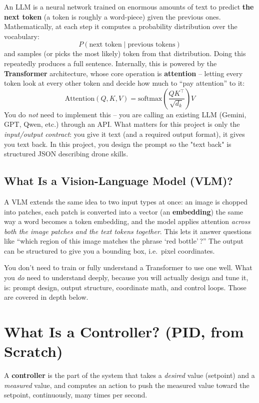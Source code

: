 \documentclass[11pt,a4paper]{article}
\begin{document}
An LLM is a neural network trained on enormous amounts of text to predict \textbf{the next
token} (a token is roughly a word-piece) given the previous ones. Mathematically, at each step
it computes a probability distribution over the vocabulary:
\[
P(\text{next token} \mid \text{previous tokens})
\]
and samples (or picks the most likely) token from that distribution. Doing this repeatedly
produces a full sentence. Internally, this is powered by the \textbf{Transformer} architecture,
whose core operation is \textbf{attention} -- letting every token look at every other token and
decide how much to ``pay attention'' to it:
\[
\text{Attention}(Q,K,V) = \text{softmax}\!\left(\frac{QK^{\top}}{\sqrt{d_k}}\right)V
\]
You do \emph{not} need to implement this -- you are calling an existing LLM (Gemini, GPT, Qwen,
etc.) through an API. What matters for this project is only the \emph{input/output contract}:
you give it text (and a required output format), it gives you text back. In this project, you
design the prompt so the "text back" is structured JSON describing drone skills.

\subsection{What Is a Vision-Language Model (VLM)?}

A VLM extends the same idea to two input types at once: an image is chopped into patches,
each patch is converted into a vector (an \textbf{embedding}) the same way a word becomes a
token embedding, and the model applies attention \emph{across both the image patches and the
text tokens together}. This lets it answer questions like ``which region of this image matches
the phrase `red bottle'\,?'' The output can be structured to give you a bounding box, i.e.\ pixel
coordinates.

\begin{quotebox}
You don't need to train or fully understand a Transformer to use one well. What you \emph{do}
need to understand deeply, because you will actually design and tune it, is: prompt design,
output structure, coordinate math, and control loops. Those are covered in depth below.
\end{quotebox}

\section{What Is a Controller? (PID, from Scratch)}
\label{sec:pid}

A \textbf{controller} is the part of the system that takes a \emph{desired} value (setpoint) and
a \emph{measured} value, and computes an action to push the measured value toward the setpoint,
continuously, many times per second.
\end{document}
